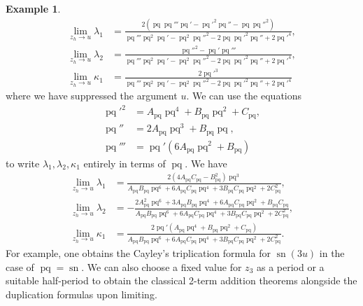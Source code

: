 \documentclass{amsart}
\theoremstyle{definition}
\newtheorem{example}[theorem]{Example}
\DeclareMathOperator{\sn}{sn}
\DeclareMathOperator{\pq}{pq}
\begin{document}
\begin{example}
\begin{align*}
    \lim_{z_h\to u}\lambda_1&=\frac{2(\pq \pq'''\pq'-\pq'^2\pq''-\pq\pq''^2)}{\pq'''\pq^2\pq'-\pq^2\pq''^2-2\pq\pq'^2\pq''+2\pq'^4},\\
\lim_{z_h\to u}\lambda_2&=\frac{\pq''^2-\pq'\pq'''}{\pq'''\pq^2\pq'-\pq^2\pq''^2-2\pq\pq'^2\pq''+2\pq'^4},\\
\lim_{z_h\to u}\kappa_1&=\frac{2\pq'^3}{\pq'''\pq^2\pq'-\pq^2\pq''^2-2\pq\pq'^2\pq''+2\pq'^4}
\end{align*}
where we have suppressed the argument $u$. We can use the equations
\begin{align*}
    \pq'^2&=A_{\pq}\pq^4+B_{\pq}\pq^2+C_{\pq},\\
\pq''&=2A_{\pq}\pq^3+B_{\pq}\pq,\\
\pq'''&=\pq'\left( 6A_{\pq}\pq^2 +B_{\pq}\right)
\end{align*}
to write $\lambda_1,\lambda_2,\kappa_1$ entirely in terms of $\pq$. We have
\begin{align*}
    \lim_{z_h\to u}\lambda_1&=\frac{2(4A_{\pq}C_{\pq}-B_{\pq}^2)\pq^3}{A_{\pq}B_{\pq}\pq^6+6A_{\pq}C_{\pq}\pq^4+3B_{\pq}C_{\pq}\pq^2+2C_{\pq}^2},\\
\lim_{z_h\to u}\lambda_2&=-\frac{2A_{\pq}^2\pq^6+3A_{\pq}B_{\pq}\pq^4+6A_{\pq}C_{\pq}\pq^2+B_{\pq}C_{\pq}}{A_{\pq}B_{\pq}\pq^6+6A_{\pq}C_{\pq}\pq^4+3B_{\pq}C_{\pq}\pq^2+2C_{\pq}^2},\\
\lim_{z_h\to u}\kappa_1&=\frac{2\pq'(A_{\pq}\pq^4+B_{\pq}\pq^2+C_{\pq})}{A_{\pq}B_{\pq}\pq^6+6A_{\pq}C_{\pq}\pq^4+3B_{\pq}C_{\pq}\pq^2+2C_{\pq}^2}.
\end{align*}
For example, one obtains the Cayley's triplication formula for $\sn (3u)$ in the case of $\pq=\sn$. We can also choose a fixed value for $z_3$ as a period or a suitable half-period to obtain the classical 2-term addition theorems alongside the duplication formulas upon limiting.
\end{example}
\end{document}

